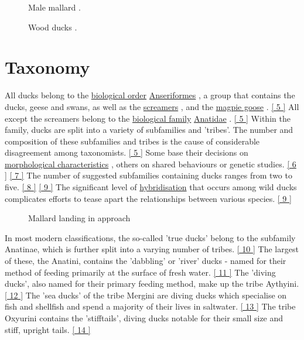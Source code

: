 \documentclass[11pt,a4paper]{article}
\begin{document}
\begin{figure}[h]
\caption{Male mallard .}
\end{figure}

\begin{figure}[h]
\caption{Wood ducks .}
\end{figure}

\section{Taxonomy}

All ducks belong to the \href{/wiki/Order\_\%28biology\%29}{biological order} \href{/wiki/Anseriformes}{Anseriformes} , a group that contains the ducks, geese and swans, as well as the \href{/wiki/Screamer}{screamers} , and the \href{/wiki/Magpie\_goose}{magpie goose} . \href{\#cite\_note-FOOTNOTECarboneras1992536-5}{[ 5 ]} All except the screamers belong to the \href{/wiki/Family\_\%28biology\%29}{biological family} \href{/wiki/Anatidae}{Anatidae} . \href{\#cite\_note-FOOTNOTECarboneras1992536-5}{[ 5 ]} Within the family, ducks are split into a variety of subfamilies and 'tribes'. The number and composition of these subfamilies and tribes is the cause of considerable disagreement among taxonomists. \href{\#cite\_note-FOOTNOTECarboneras1992536-5}{[ 5 ]} Some base their decisions on \href{/wiki/Morphology\_\%28biology\%29}{morphological characteristics} , others on shared behaviours or genetic studies. \href{\#cite\_note-FOOTNOTELivezey1986737–738-6}{[ 6 ]} \href{\#cite\_note-FOOTNOTEMadsenMcHughde\_Kloet1988452-7}{[ 7 ]} The number of suggested subfamilies containing ducks ranges from two to five. \href{\#cite\_note-FOOTNOTEDonne-GousséLaudetHänni2002353–354-8}{[ 8 ]} \href{\#cite\_note-FOOTNOTECarboneras1992540-9}{[ 9 ]} The significant level of \href{/wiki/Hybrid\_\%28biology\%29}{hybridisation} that occurs among wild ducks complicates efforts to tease apart the relationships between various species. \href{\#cite\_note-FOOTNOTECarboneras1992540-9}{[ 9 ]}

\begin{figure}[h]
\caption{Mallard landing in approach}
\end{figure}

In most modern classifications, the so-called 'true ducks' belong to the subfamily Anatinae, which is further split into a varying number of tribes. \href{\#cite\_note-FOOTNOTEElphickDunningSibley2001191-10}{[ 10 ]} The largest of these, the Anatini, contains the 'dabbling' or 'river' ducks - named for their method of feeding primarily at the surface of fresh water. \href{\#cite\_note-FOOTNOTEKear2005448-11}{[ 11 ]} The 'diving ducks', also named for their primary feeding method, make up the tribe Aythyini. \href{\#cite\_note-FOOTNOTEKear2005622–623-12}{[ 12 ]} The 'sea ducks' of the tribe Mergini are diving ducks which specialise on fish and shellfish and spend a majority of their lives in saltwater. \href{\#cite\_note-FOOTNOTEKear2005686-13}{[ 13 ]} The tribe Oxyurini contains the 'stifftails', diving ducks notable for their small size and stiff, upright tails. \href{\#cite\_note-FOOTNOTEElphickDunningSibley2001193-14}{[ 14 ]}
\end{document}
